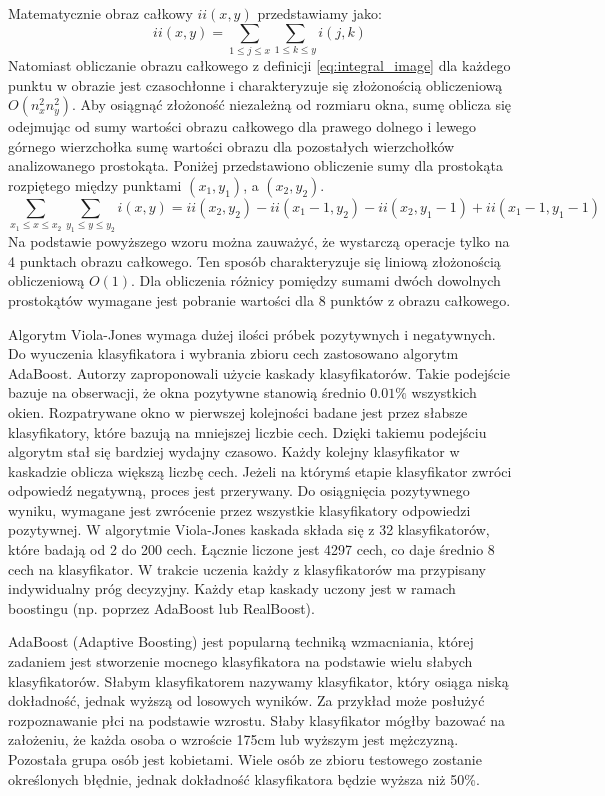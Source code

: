 \FloatBarrier
Matematycznie obraz całkowy $ii(x,y)$ przedstawiamy jako:
\begin{equation}
    \label{eq:integral_image}
    ii(x,y) = \sum_{1\leq j \leq x} \sum_{1\leq k \leq y} i(j,k)
\end{equation}
Natomiast obliczanie obrazu całkowego z definicji \ref{eq:integral_image} dla każdego punktu w obrazie jest czasochłonne i charakteryzuje się złożonością obliczeniową $O(n_x^2 n_y^2)$.
Aby osiągnąć złożoność niezależną od rozmiaru okna, sumę oblicza się odejmując od sumy wartości obrazu całkowego dla prawego dolnego i lewego górnego wierzchołka sumę wartości obrazu dla pozostałych wierzchołków analizowanego prostokąta.
Poniżej przedstawiono obliczenie sumy dla prostokąta rozpiętego między punktami $(x_1, y_1)$, a $(x_2, y_2)$.
\begin{equation}
    \label{eq:integral_image_x_y}
    \sum_{x_1\leq x \leq x_2} \sum_{y_1\leq y \leq y_2} i(x,y) = ii(x_2, y_2) - ii(x_1 - 1, y_2) - ii(x_2, y_1 - 1) + ii(x_1 - 1, y_1 - 1)
\end{equation}
Na podstawie powyższego wzoru można zauważyć, że wystarczą operacje tylko na 4 punktach obrazu całkowego.
Ten sposób charakteryzuje się liniową złożonością obliczeniową $O(1)$.
Dla obliczenia różnicy pomiędzy sumami dwóch dowolnych prostokątów wymagane jest pobranie wartości dla 8 punktów z obrazu całkowego.

Algorytm Viola-Jones wymaga dużej ilości próbek pozytywnych i negatywnych.
Do wyuczenia klasyfikatora i wybrania zbioru cech zastosowano algorytm AdaBoost.
Autorzy zaproponowali użycie kaskady klasyfikatorów.
Takie podejście bazuje na obserwacji, że okna pozytywne stanowią średnio $0.01\%$ wszystkich okien.
Rozpatrywane okno w pierwszej kolejności badane jest przez słabsze klasyfikatory, które bazują na mniejszej liczbie cech.
Dzięki takiemu podejściu algorytm stał się bardziej wydajny czasowo.
Każdy kolejny klasyfikator w kaskadzie oblicza większą liczbę cech.
Jeżeli na którymś etapie klasyfikator zwróci odpowiedź negatywną, proces jest przerywany.
Do osiągnięcia pozytywnego wyniku, wymagane jest zwrócenie przez wszystkie klasyfikatory odpowiedzi pozytywnej.
W algorytmie Viola-Jones kaskada składa się z 32 klasyfikatorów, które badają od 2 do 200 cech.
Łącznie liczone jest 4297 cech, co daje średnio 8 cech na klasyfikator.
W trakcie uczenia każdy z klasyfikatorów ma przypisany indywidualny próg decyzyjny.
Każdy etap kaskady uczony jest w ramach boostingu (np. poprzez AdaBoost lub
RealBoost).

AdaBoost (Adaptive Boosting) jest popularną techniką wzmacniania, której zadaniem jest stworzenie mocnego klasyfikatora na podstawie wielu słabych klasyfikatorów.
Słabym klasyfikatorem nazywamy klasyfikator, który osiąga niską dokładność, jednak wyższą od losowych wyników.
Za przykład może posłużyć rozpoznawanie płci na podstawie wzrostu.
Słaby klasyfikator mógłby bazować na założeniu, że każda osoba o wzroście 175cm lub wyższym jest mężczyzną.
Pozostała grupa osób jest kobietami.
Wiele osób ze zbioru testowego zostanie określonych błędnie, jednak dokładność klasyfikatora będzie wyższa niż 50\%.

